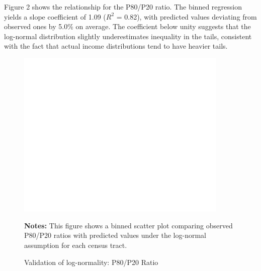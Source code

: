 Figure 2 shows the relationship for the P80/P20 ratio. The binned regression yields a slope coefficient of 1.09 ($R^2$ = 0.82), with predicted values deviating from observed ones by 5.0\% on average. The coefficient below unity suggests that the log-normal distribution slightly underestimates inequality in the tails, consistent with the fact that actual income distributions tend to have heavier tails.

\begin{figure}[H]
\begin{center}
\captionsetup{justification=centering}
\caption{Validation of log-normality: P80/P20 Ratio}
\label{fig:p80p20}
\includegraphics[width=0.9\textwidth]{output/binned_scatter_p80p20.png}
\end{center}
\begin{fignotes}
\textbf{Notes:} This figure shows a binned scatter plot comparing observed P80/P20 ratios with predicted values under the log-normal assumption for each census tract.
\end{fignotes}
\end{figure}